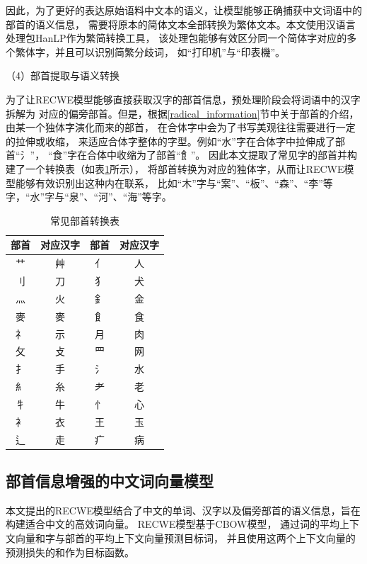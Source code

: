 因此，为了更好的表达原始语料中文本的语义，让模型能够正确捕获中文词语中的部首的语义信息，
需要将原本的简体文本全部转换为繁体文本。本文使用汉语言处理包HanLP作为繁简转换工具，
该处理包能够有效区分同一个简体字对应的多个繁体字，并且可以识别简繁分歧词，
如“打印机”与“印表機”。

（4）部首提取与语义转换

为了让RECWE模型能够直接获取汉字的部首信息，预处理阶段会将词语中的汉字拆解为
对应的偏旁部首。但是，根据\ref{radical_information}节中关于部首的介绍，
由某一个独体字演化而来的部首，
在合体字中会为了书写美观往往需要进行一定的拉伸或收缩，
来适应合体字整体的字型。例如“水”字在合体字中拉伸成了部首“氵”，
“食”字在合体中收缩为了部首“飠”。
因此本文提取了常见字的部首并构建了一个转换表（如表\ref{char_tran_form}所示），
将部首转换为对应的独体字，从而让RECWE模型能够有效识别出这种内在联系，
比如“木”字与“案”、“板”、“森”、“李”等字，“水”字与“泉”、“河”、“海”等字。

\begin{table}[h]
\caption{常见部首转换表}
\begin{tabular}{|c|c|c|c|}
    \hline
    部首 & 对应汉字 & 部首 & 对应汉字 \\
    \hline
    艹 & 艸 & 亻 & 人\\
    \hline
    刂 & 刀 & 犭 & 犬\\
    \hline
    灬 & 火 & 釒 & 金\\
    \hline
    麥 & 麥 & 飠 & 食\\
    \hline
    礻 & 示 & 月 & 肉\\
    \hline
    攵 & 攴 & 罒 & 网\\
    \hline
    扌 & 手 & 氵 & 水\\
    \hline
    糹 & 糸 & 耂 & 老\\
    \hline
    牜 & 牛 & 忄 & 心\\
    \hline
    衤 & 衣 & 王 & 玉\\
    \hline
    辶 & 走 & 疒 & 病\\
    \hline
\end{tabular}
\label{char_tran_form}
\end{table}
\subsection{部首信息增强的中文词向量模型}
本文提出的RECWE模型结合了中文的单词、汉字以及偏旁部首的语义信息，旨在构建适合中文的高效词向量。
RECWE模型基于CBOW模型，
通过词的平均上下文向量和字与部首的平均上下文向量预测目标词，
并且使用这两个上下文向量的预测损失的和作为目标函数。


